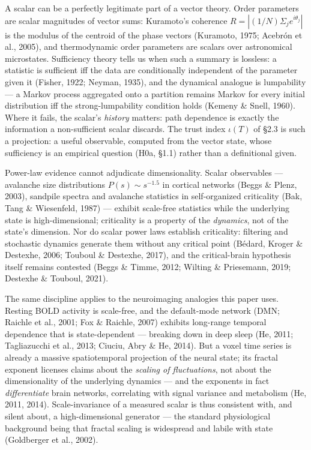 \documentclass[
]{article}
\begin{document}
A scalar can be a perfectly legitimate part of a vector theory. Order
parameters are scalar magnitudes of vector sums: Kuramoto's coherence
\(R = |(1/N)\Sigma_j e^{i\theta_j}|\) is the modulus of the centroid of
the phase vectors (Kuramoto, 1975; Acebrón et al., 2005), and
thermodynamic order parameters are scalars over astronomical
microstates. Sufficiency theory tells us when such a summary is
lossless: a statistic is sufficient iff the data are conditionally
independent of the parameter given it (Fisher, 1922; Neyman, 1935), and
the dynamical analogue is lumpability --- a Markov process aggregated
onto a partition remains Markov for every initial distribution iff the
strong-lumpability condition holds (Kemeny \& Snell, 1960). Where it
fails, the scalar's \emph{history} matters: path dependence is exactly
the information a non-sufficient scalar discards. The trust index
\(\iota(T)\) of §2.3 is such a projection: a useful observable, computed
from the vector state, whose sufficiency is an empirical question (H0a,
§1.1) rather than a definitional given.

Power-law evidence cannot adjudicate dimensionality. Scalar observables
--- avalanche size distributions \(P(s) \sim s^{-1.5}\) in cortical
networks (Beggs \& Plenz, 2003), sandpile spectra and avalanche
statistics in self-organized criticality (Bak, Tang \& Wiesenfeld, 1987)
--- exhibit scale-free statistics while the underlying state is
high-dimensional; criticality is a property of the \emph{dynamics}, not
of the state's dimension. Nor do scalar power laws establish
criticality: filtering and stochastic dynamics generate them without any
critical point (Bédard, Kroger \& Destexhe, 2006; Touboul \& Destexhe,
2017), and the critical-brain hypothesis itself remains contested (Beggs
\& Timme, 2012; Wilting \& Priesemann, 2019; Destexhe \& Touboul, 2021).

The same discipline applies to the neuroimaging analogies this paper
uses. Resting BOLD activity is scale-free, and the default-mode network
(DMN; Raichle et al., 2001; Fox \& Raichle, 2007) exhibits long-range
temporal dependence that is state-dependent --- breaking down in deep
sleep (He, 2011; Tagliazucchi et al., 2013; Ciuciu, Abry \& He, 2014).
But a voxel time series is already a massive spatiotemporal projection
of the neural state; its fractal exponent licenses claims about the
\emph{scaling of fluctuations}, not about the dimensionality of the
underlying dynamics --- and the exponents in fact \emph{differentiate}
brain networks, correlating with signal variance and metabolism (He,
2011, 2014). Scale-invariance of a measured scalar is thus consistent
with, and silent about, a high-dimensional generator --- the standard
physiological background being that fractal scaling is widespread and
labile with state (Goldberger et al., 2002).
\end{document}
